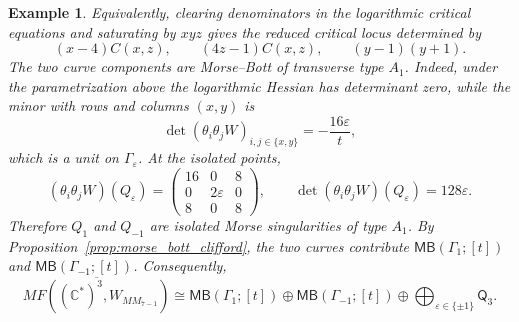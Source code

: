 \documentclass[11pt]{amsart}
\newtheorem{example}{Example}[section]
\newcommand{\MorseCat}[1]{\mathsf{Q}_{#1}}
\newcommand{\MBtwcat}[2]{\mathsf{MB}(#1;[#2])}
\begin{document}
\begin{example}
Equivalently, clearing denominators in the logarithmic critical equations and
saturating by $xyz$ gives the reduced critical locus determined by
\[
(x-4)C(x,z),
\qquad
(4z-1)C(x,z),
\qquad
(y-1)(y+1).
\]
The two curve components are Morse--Bott of transverse type $A_1$. Indeed,
under the parametrization above the logarithmic Hessian has determinant zero,
while the minor with rows and columns $(x,y)$ is
\[
\det(\theta_i\theta_jW)_{i,j\in\{x,y\}}
=-\frac{16\varepsilon}{t},
\]
which is a unit on $\Gamma_{\varepsilon}$. At the isolated points,
\[
(\theta_i\theta_jW)(Q_{\varepsilon})=
\begin{pmatrix}
16 & 0 & 8 \\
0 & 2\varepsilon & 0 \\
8 & 0 & 8
\end{pmatrix},
\qquad
\det(\theta_i\theta_jW)(Q_{\varepsilon})=128\varepsilon.
\]
Therefore $Q_1$ and $Q_{-1}$ are isolated Morse singularities of type $A_1$.
By Proposition~\ref{prop:morse_bott_clifford}, the two curves contribute
$\MBtwcat{\Gamma_1}{t}$ and $\MBtwcat{\Gamma_{-1}}{t}$. Consequently,
\[
\overline{MF((\mathbb{C}^*)^3,W_{MM_{7-1}})}
\cong \MBtwcat{\Gamma_1}{t}\oplus \MBtwcat{\Gamma_{-1}}{t}
\oplus \bigoplus_{\varepsilon\in\{\pm1\}}\MorseCat{3}.
\]
\end{example}
\end{document}
